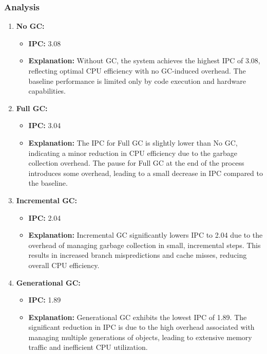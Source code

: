 \documentclass[10pt]{article}
\begin{document}
\subsubsection{Analysis}
\begin{enumerate}
  \item \textbf{No GC:} 
  \begin{itemize}
    \item \textbf{IPC:} 3.08
    \item \textbf{Explanation:} Without GC, the system achieves the highest IPC of 3.08, reflecting optimal CPU efficiency with no GC-induced overhead. The baseline performance is limited only by code execution and hardware capabilities.
  \end{itemize}

  \item \textbf{Full GC:} 
  \begin{itemize}
    \item \textbf{IPC:} 3.04
    \item \textbf{Explanation:} The IPC for Full GC is slightly lower than No GC, indicating a minor reduction in CPU efficiency due to the garbage collection overhead. The pause for Full GC at the end of the process introduces some overhead, leading to a small decrease in IPC compared to the baseline.
  \end{itemize}

  \item \textbf{Incremental GC:} 
  \begin{itemize}
    \item \textbf{IPC:} 2.04
    \item \textbf{Explanation:} Incremental GC significantly lowers IPC to 2.04 due to the overhead of managing garbage collection in small, incremental steps. This results in increased branch mispredictions and cache misses, reducing overall CPU efficiency.
  \end{itemize}

  \item \textbf{Generational GC:} 
  \begin{itemize}
    \item \textbf{IPC:} 1.89
    \item \textbf{Explanation:} Generational GC exhibits the lowest IPC of 1.89. The significant reduction in IPC is due to the high overhead associated with managing multiple generations of objects, leading to extensive memory traffic and inefficient CPU utilization.
  \end{itemize}
\end{enumerate}
\end{document}

